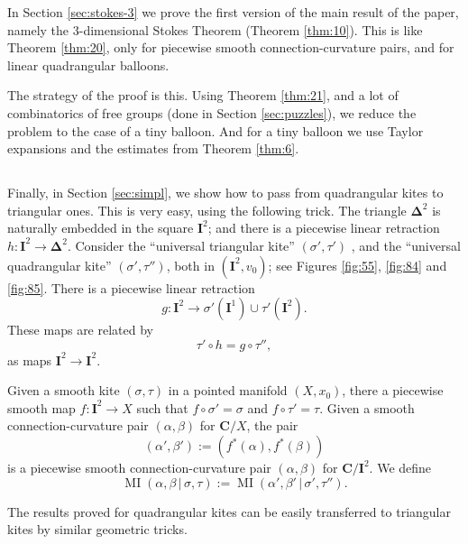 \documentclass[10pt, a4paper]{amsart}
\theoremstyle{definition}
\numberwithin{equation}{section}
\newcommand{\opn}{\operatorname}
\newcommand{\mbf}[1]{\mathbf{#1}}
\newcommand{\bsym}[1]{\boldsymbol{#1}}
\renewcommand{\vert}{\, | \,}
\begin{document}
In Section \ref{sec:stokes-3} we prove the first version of the main 
result of the paper,
namely the $3$-dimensional Stokes Theorem (Theorem \ref{thm:10}). 
This is like Theorem \ref{thm:20}, only for piecewise smooth
connection-curvature pairs, and for linear quadrangular balloons. 

The strategy of the proof is this. Using Theorem \ref{thm:21}, and a lot of
combinatorics of free groups (done in Section \ref{sec:puzzles}), we reduce the
problem to the case of a tiny balloon. And for a tiny balloon we use Taylor
expansions and the estimates from Theorem \ref{thm:6}.


\subsection{} \label{subsec:triangles}
Finally, in Section \ref{sec:simpl}, we show how to pass from quadrangular
kites  to triangular ones. 
This is very easy, using the following trick. The triangle 
$\bsym{\Delta}^2$ is naturally embedded in the square $\mbf{I}^2$; and 
there is a piecewise linear retraction 
$h : \mbf{I}^2 \to \bsym{\Delta}^2$. 
Consider the ``universal triangular kite'' 
$(\sigma', \tau')$ , and the ``universal quadrangular kite''
$(\sigma', \tau'')$, both 
in $(\mbf{I}^2, v_0)$; see Figures \ref{fig:55}, \ref{fig:84} and \ref{fig:85}.
There is a piecewise linear retraction 
\[ g : \mbf{I}^2 \to \sigma'(\mbf{I}^1) \cup \tau'(\mbf{I}^2) . \]
These maps are
related by 
\[ \tau' \circ h = g \circ \tau'' , \]
as maps $\mbf{I}^2 \to \mbf{I}^2$.

Given a smooth kite $(\sigma, \tau)$ in a pointed manifold
$(X, x_0)$, there a piecewise smooth map
$f :  \mbf{I}^2 \to X$
such that 
$f \circ \sigma' = \sigma$ and
$f \circ \tau' = \tau$. Given a smooth connection-curvature pair
$(\alpha, \beta)$ for $\mbf{C} / X$, the pair
\[ (\alpha', \beta') := (f^*(\alpha), f^*(\beta)) \]
is a piecewise smooth connection-curvature pair
$(\alpha, \beta)$ for $\mbf{C} / \mbf{I}^2$.
We define
\begin{equation} \label{eqn:173}
\opn{MI}(\alpha, \beta \vert \sigma, \tau) :=
\opn{MI}(\alpha', \beta' \vert \sigma', \tau'') . 
\end{equation}

The results proved for quadrangular kites can be easily transferred to
triangular kites by similar geometric tricks.  
\end{document}
